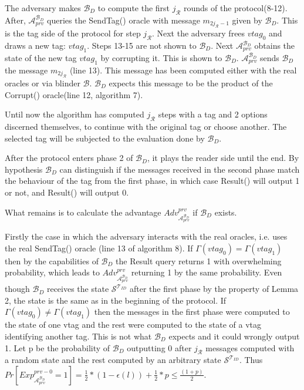     The adversary makes $\mathcal{B}_D$ to compute the first $j_{\mathcal{R}}$ rounds of the protocol(8-12). After, $\mathcal{A}_{prv}^{\mathcal{B}_D}$ queries the 
    SendTag() oracle with message $m_{2j_{\mathcal{R}}-1}$ given by $\mathcal{B}_D$. This is the tag side of the protocol for step $j_{\mathcal{R}}$. Next the adversary
    frees $vtag_{0}$ and draws a new tag: $vtag_{1}$. Steps 13-15 are not shown to $\mathcal{B}_D$. Next $\mathcal{A}_{prv}^{\mathcal{B}_D}$ obtains the state of
    the new tag $vtag_{1}$ by corrupting it. This is shown to $\mathcal{B}_D$. $\mathcal{A}_{prv}^{\mathcal{B}_D}$ sends $\mathcal{B}_D$ the message $m_{2j_{\mathcal{R}}}$ 
    (line 13). This message has been computed either with the real oracles or via blinder $\mathcal{B}$. $\mathcal{B}_D$ expects this message to be the product of the Corrupt()
    oracle(line 12, algorithm 7).

    Until now the algorithm has computed $j_{\mathcal{R}}$ steps with a tag and 2 options discerned themselves, to continue with the original tag or choose another. The selected 
    tag will be subjected to the evaluation done by $\mathcal{B}_D$. 

    After the protocol enters phase 2 of $\mathcal{B}_D$, it plays the reader side until the end. By hypothesis $\mathcal{B}_D$ can distinguish if the messages received in the second
    phase match the behaviour of the tag from the first phase, in which case Result() will output 1 or not, and Result() will output 0. 
    
    What remains is to calculate the advantage $Adv_{\mathcal{A}_{prv}^{\mathcal{B}_D}}^{prv}$ if $\mathcal{B}_D$ exists.

    Firstly the case in which the adversary interacts with the real oracles, i.e. uses the real SendTag() oracle (line 13 of algorithm 8). If
    $\Gamma(vtag_0) = \Gamma(vtag_1)$ then by the capabilities of $\mathcal{B}_D$ the Result query returns 1 with overwhelming probability, which
    leads to $Adv_{\mathcal{A}_{prv}^{\mathcal{B}_D}}^{prv}$ returning 1 by the same probability. Even though $\mathcal{B}_D$ receives the state
    $\mathcal{S}^{\mathcal{T}_{ID}}$ after the first phase by the property of Lemma 2, the state is the same as in the beginning of the protocol.
    If $\Gamma(vtag_0) \neq \Gamma(vtag_1)$ then the messages in the first phase were computed to the state of one vtag and the rest were computed
    to the state of a vtag identifying another tag. This is not what $\mathcal{B}_D$ expects and it could wrongly output 1. Let p be the probability
    of $\mathcal{B}_D$ outputting 0 after $j_\mathcal{R}$ messages computed with a random state and the rest computed by an arbitrary state 
    $\mathcal{S}^{\mathcal{T}_{ID}}$. Thus $Pr[Exp_{\mathcal{A}_{prv}^{\mathcal{B}_D}}^{prv-0} = 1] = \frac{1}{2}*(1-\epsilon(l))
    +\frac{1}{2}*p \leq \frac{(1+p)}{2}.$

